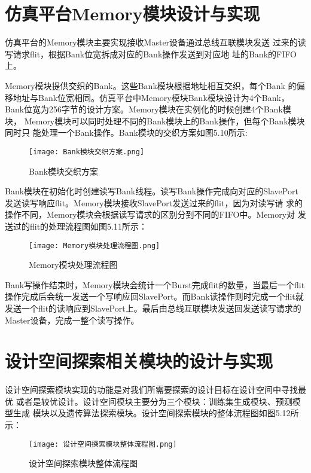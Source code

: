 \section{仿真平台Memory模块设计与实现}

仿真平台的Memory模块主要实现接收Master设备通过总线互联模块发送
过来的读写请求flit，根据Bank位宽拆成对应的Bank操作发送到对应地
址的Bank的FIFO上。

Memory模块提供交织的Bank。这些Bank模块根据地址相互交织，每个Bank
的偏移地址与Bank位宽相同。仿真平台中Memory模块Bank模块设计为4个Bank，
Bank位宽为256字节的设计方案。Memory模块在实例化的时候创建4个Bank模块，
Memory模块可以同时处理不同的Bank模块上的Bank操作，但每个Bank模块同时只
能处理一个Bank操作。Bank模块的交织方案如图5.10所示:
\\
\begin{figure}
    \centering
    \texttt{[image: Bank模块交织方案.png]}
    \caption{Bank模块交织方案}
    \label{fig:badge}
\end{figure}

Bank模块在初始化时创建读写Bank线程。读写Bank操作完成向对应的SlavePort
发送读写响应flit。Memory模块接收SlavePort发送过来的flit，因为对读写请
求的操作不同，Memory模块会根据读写请求的区别分到不同的FIFO中。Memory对
发送过的flit的处理流程图如图5.11所示：

\begin{figure}
    \centering
    \texttt{[image: Memory模块处理流程图.png]}
    \caption{Memory模块处理流程图}
    \label{fig:badge}
\end{figure}

Bank写操作结束时，Memory模块会统计一个Burst完成flit的数量，当最后一个flit
操作完成后会统一发送一个写响应回SlavePort。而Bank读操作则时完成一个flit就
发送一个flit的读响应到SlavePort上。最后由总线互联模块发送回发送读写请求的
Master设备，完成一整个读写操作。

\section{设计空间探索相关模块的设计与实现}

设计空间探索模块实现的功能是对我们所需要探索的设计目标在设计空间中寻找最优
或者是较优设计。设计空间模块主要分为三个模块：训练集生成模块、预测模型生成
模块以及遗传算法探索模块。设计空间探索模块的整体流程图如图5.12所示：

\begin{figure}
    \centering
    \texttt{[image: 设计空间探索模块整体流程图.png]}
    \caption{设计空间探索模块整体流程图}
    \label{fig:badge}
\end{figure}

